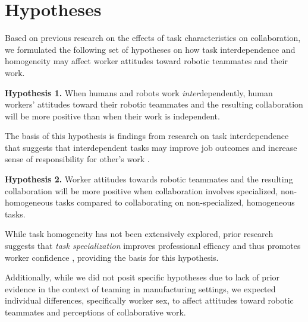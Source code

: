 \section{Hypotheses}
Based on previous research on the effects of task characteristics on collaboration, we formulated the following set of hypotheses on how task interdependence and homogeneity may affect worker attitudes toward robotic teammates and their work.

\textbf{Hypothesis 1.} When humans and robots work \textit{inter}dependently, human workers' attitudes toward their robotic teammates and the resulting collaboration will be more positive than when their work is independent.

The basis of this hypothesis is findings from research on task interdependence that suggests that interdependent tasks may improve job outcomes and increase sense of responsibility for other's work \cite{van1998motivating, johnson2012autonomy}.

\textbf{Hypothesis 2.} Worker attitudes towards robotic teammates and the resulting collaboration will be more positive when collaboration involves specialized, non-homogeneous tasks compared to collaborating on non-specialized, homogeneous tasks.

While task homogeneity has not been extensively explored, prior research suggests that \textit{task specialization} improves professional efficacy and thus promotes worker confidence \cite{hsieh2004reassessment}, providing the basis for this hypothesis. 

Additionally, while we did not posit specific hypotheses due to lack of prior evidence in the context of teaming in manufacturing settings, we expected individual differences, specifically worker sex, to affect attitudes toward robotic teammates and perceptions of collaborative work.
